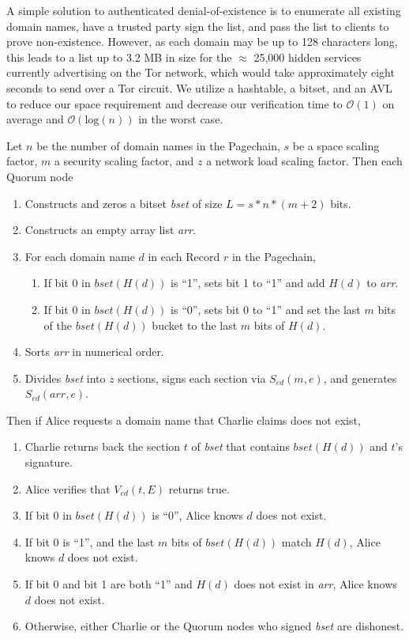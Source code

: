 \documentclass{sig-alternate}
\begin{document}
A simple solution to authenticated denial-of-existence is to enumerate all existing domain names, have a trusted party sign the list, and pass the list to clients to prove non-existence. However, as each domain may be up to 128 characters long, this leads to a list up to 3.2 MB in size for the $ \approx $ 25,000 hidden services currently advertising on the Tor network, which would take approximately eight seconds to send over a Tor circuit.\cite{TorMetrics} We utilize a hashtable, a bitset, and an AVL to reduce our space requirement and decrease our verification time to $ \mathcal{O}(1) $ on average and $ \mathcal{O}(\mathrm{log}(n)) $ in the worst case.

Let $ n $ be the number of domain names in the Pagechain, $ s $ be a space scaling factor, $ m $ a security scaling factor, and $ z $ a network load scaling factor. Then each Quorum node

\begin{enumerate}[noitemsep]
	\item Constructs and zeros a bitset \emph{bset} of size $ L = s * n * (m + 2) $ bits.
	\item Constructs an empty array list \emph{arr}.
	\item For each domain name $ d $ in each Record $ r $ in the Pagechain,
		\begin{enumerate}
			\item If bit 0 in $ \mathit{bset}(H(d)) $ is ``1'', sets bit 1 to ``1'' and add $ H(d) $ to \emph{arr}.
			\item If bit 0 in $ \mathit{bset}(H(d)) $ is ``0'', sets bit 0 to ``1'' and set the last $ m $ bits of the $ \mathit{bset}(H(d)) $ bucket to the last $ m $ bits of $ H(d) $.
		\end{enumerate}
	\item Sorts \emph{arr} in numerical order.
	\item Divides \emph{bset} into $ z $ sections, signs each section via $ S_{\mathit{ed}}(m, e) $, and generates $ S_{\mathit{ed}}(\mathit{arr}, e) $.
\end{enumerate}

Then if Alice requests a domain name that Charlie claims does not exist,

\begin{enumerate}[noitemsep]
	\item Charlie returns back the section $ t $ of \emph{bset} that contains $ \mathit{bset}(H(d)) $ and $ t $'s signature.
	\item Alice verifies that $ V_{\mathit{ed}}(t, E) $ returns true.
	\item If bit 0 in $ \mathit{bset}(H(d)) $ is ``0'', Alice knows $ d $ does not exist.
	\item If bit 0 is ``1'', and the last $ m $ bits of $ \mathit{bset}(H(d)) $ match $ H(d) $, Alice knows $ d $ does not exist.
	\item If bit 0 and bit 1 are both ``1'' and $ H(d) $ does not exist in \emph{arr}, Alice knows $ d $ does not exist.
	\item Otherwise, either Charlie or the Quorum nodes who signed \emph{bset} are dishonest.
\end{enumerate}
\end{document}

